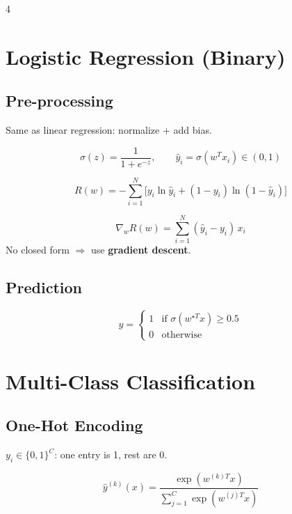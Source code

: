 \documentclass[8pt,a4paper,landscape]{extarticle}
\begin{document}
\begin{multicols*}{4}
\section{Logistic Regression (Binary)}

\subsection{Pre-processing}
Same as linear regression: normalize + add bias.

\begin{defn}[title=Sigmoid]
\[ \sigma(z) = \frac{1}{1+e^{-z}}, \qquad \hat{y}_i = \sigma(w^T x_i) \in (0,1) \]
\end{defn}

\begin{defn}[title=Cross-Entropy Loss]
\[ R(w) = -\sum_{i=1}^{N}\!\Big[y_i\ln\hat{y}_i + (1-y_i)\ln(1-\hat{y}_i)\Big] \]
\end{defn}

\begin{prop}[title=Gradient]
\[ \nabla_w R(w) = \sum_{i=1}^{N}(\hat{y}_i - y_i)\,x_i \]
No closed form $\Rightarrow$ use \textbf{gradient descent}.
\end{prop}

\subsection{Prediction}
\[ \hat{y} = \begin{cases} 1 & \text{if } \sigma(w^{\star T}x) \geq 0.5 \\ 0 & \text{otherwise} \end{cases} \]

\section{Multi-Class Classification}

\subsection{One-Hot Encoding}
$y_i \in \{0,1\}^C$: one entry is 1, rest are 0.

\begin{defn}[title=Softmax (Logistic)]
\[ \hat{y}^{(k)}(x) = \frac{\exp(w^{(k)T}x)}{\sum_{j=1}^{C}\exp(w^{(j)T}x)} \]
\end{defn}


\end{multicols*}
\end{document}
